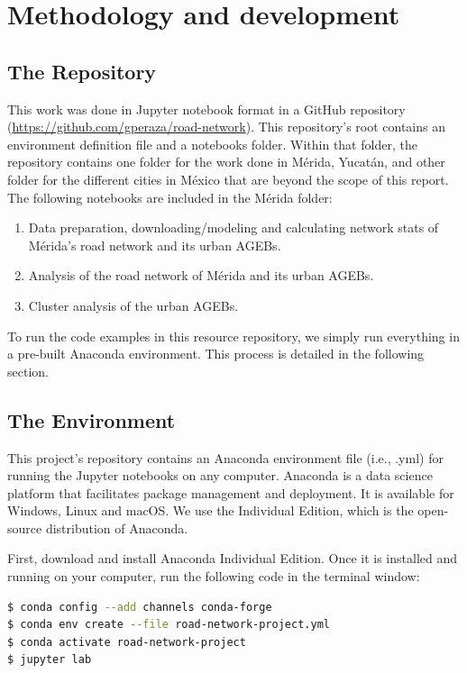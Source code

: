 \chapter{Methodology and development}
\label{cha:chapter3}

\section{The Repository}

This work was done in Jupyter notebook format in a GitHub repository (\url{https://github.com/gperaza/road-network}). This repository's root contains an environment definition file and a notebooks folder. Within that folder, the repository contains one folder for the work done in Mérida, Yucatán, and other folder for the different cities in México that are beyond the scope of this report. The following notebooks are included in the Mérida folder:

\begin{enumerate}
	\item Data preparation, downloading/modeling and calculating network stats of Mérida's road network and its urban AGEBs.
	\item Analysis of the road network of Mérida and its urban AGEBs.
	\item Cluster analysis of the urban AGEBs.
\end{enumerate}

To run the code examples in this resource repository, we simply run everything in a pre-built Anaconda environment. This process is detailed in the following section.

\section{The Environment}

This project's repository contains an Anaconda environment file (i.e., .yml) for running the Jupyter notebooks on any computer. Anaconda \cite{anaconda} is a data science platform that facilitates package management and deployment. It is available for Windows, Linux and macOS. We use the Individual Edition, which is the open-source distribution of Anaconda.

First, download and install Anaconda Individual Edition. Once it is installed and running on your computer, run the following code in the terminal window:

\begin{lstlisting}[language=bash]
$ conda config --add channels conda-forge
$ conda env create --file road-network-project.yml
$ conda activate road-network-project
$ jupyter lab
\end{lstlisting}

